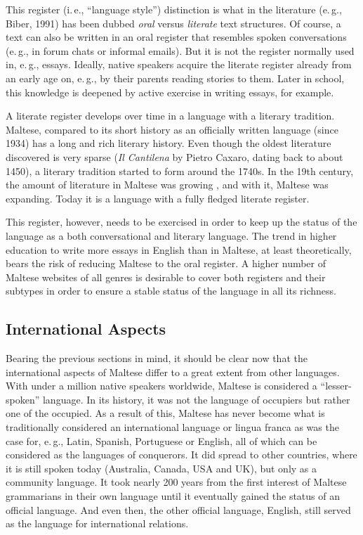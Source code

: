 \documentclass[]{../../metanetpaper}
\begin{document}
\begin{multicols}{2}
This register (i.\,e., ``language style'') distinction is what in the literature (e.\,g., Biber, 1991) has been dubbed \emph{oral} versus \emph{literate} text structures. Of course, a text can also be written in an oral register that resembles spoken conversations (e.\,g., in forum chats or informal emails). But it is not the register normally used in, e.\,g., essays. Ideally, native speakers acquire the literate register already from an early age on, e.\,g., by their parents reading stories to them. Later in school, this knowledge is deepened by active exercise in writing essays, for example.

A literate register develops over time in a language with a literary tradition. Maltese, compared to its short history as an officially written language (since 1934) has a long and rich literary history. Even though the oldest literature discovered is very sparse (\emph{Il Cantilena} by Pietro Caxaro, dating back to about 1450), a literary tradition started to form around the 1740s. In the 19th century, the amount of literature in Maltese was growing \cite{Fabri:2011a}, and with it, Maltese was expanding. Today it is a language with a fully fledged literate register. 

This register, however, needs to be exercised in order to keep up the status of the language as a both conversational and literary language. The trend in higher education to write more essays in English than in Maltese, at least theoretically, bears the risk of reducing Maltese to the oral register. A higher number of Maltese websites of all genres is desirable to cover both registers and their subtypes in order to ensure a stable status of the language in all its richness.


\subsection{International Aspects}

Bearing the previous sections in mind, it should be clear now that the international aspects of Maltese differ to a great extent from other languages. With under a million native speakers worldwide, Maltese is considered a ``lesser-spoken'' language. In its history, it was not the language of occupiers but rather one of the occupied. As a result of this, Maltese has never become what is traditionally considered an international language or lingua franca as was the case for, e.\,g., Latin, Spanish, Portuguese or English, all of which can be considered as the languages of conquerors. It did spread to other countries, where it is still spoken today (Australia, Canada, USA and UK), but only as a community language. It took nearly 200 years from the first interest of Maltese grammarians in their own language until it eventually gained the status of an official language. And even then, the other official language, English, still served as the language for international relations. 


\end{multicols}
\end{document}
